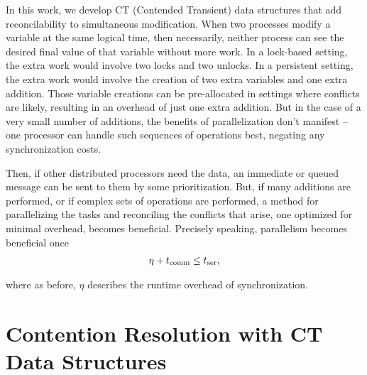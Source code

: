 In this work, we develop CT (Contended Transient) data structures that add
reconcilability to simultaneous modification. When two processes modify a
variable at the same logical time, then necessarily, neither process can see the
desired final value of that variable without more work. In a lock-based setting,
the extra work would involve two locks and two unlocks. In a persistent setting,
the extra work would involve the creation of two extra variables and one extra
addition. Those variable creations can be pre-allocated in settings where
conflicts are likely, resulting in an overhead of just one extra addition. But
in the case of a very small number of additions, the benefits of parallelization
don't manifest -- one processor can handle such sequences of operations best,
negating any synchronization costs.

Then, if other distributed processors need the data, an immediate or queued
message can be sent to them by some prioritization. But, if many additions are
performed, or if complex sets of operations are performed, a method for
parallelizing the tasks and reconciling the conflicts that arise, one optimized
for minimal overhead, becomes beneficial. Precisely speaking, parallelism
becomes beneficial once
\begin{align*}
    \eta + t_\mathrm{comm} \leq t_\mathrm{ser} \text{,}
\end{align*}

where as before, $\eta$ describes the runtime overhead of synchronization.

\section{Contention Resolution with CT Data Structures}

